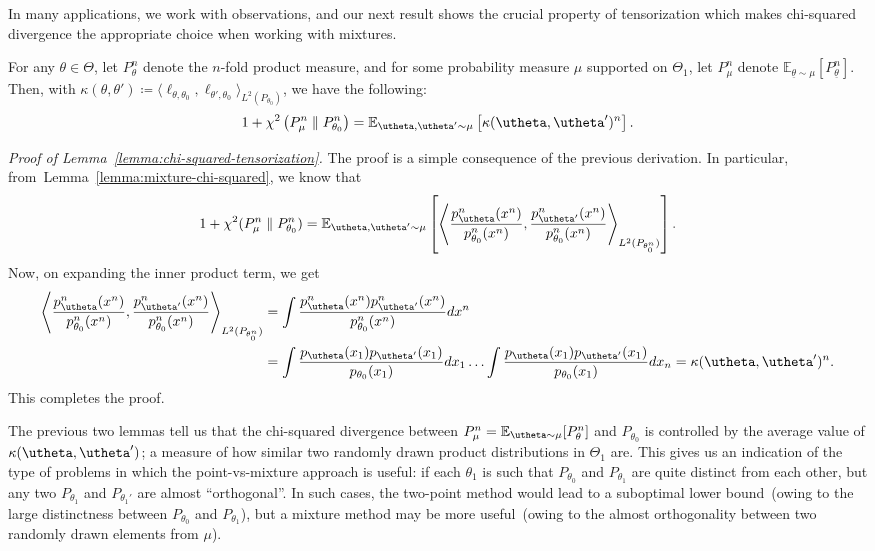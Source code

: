 \documentclass[12pt]{article}
\begin{document}
In many applications, we work with \iid observations, and our next result shows the crucial property of tensorization which makes chi-squared divergence the appropriate choice when working with mixtures. 

\begin{lemma}
\label{lemma:chi-squared-tensorization} For any $\theta \in \Theta$, let $P_{\theta}^n$ denote  the $n$-fold product measure, and for some probability measure $\mu$ supported on $\Theta_1$, let $P_\mu^n$ denote $\mathbb{E}_{\underline{\theta} \sim \mu}[P_{\underline{\theta}}^n]$. Then, with $\kappa(\theta, \theta') \coloneqq \langle \ell_{\theta, \theta_0}, \ell_{\theta', \theta_0} \rangle_{L^2(P_{\theta_0})}$, we have the following: 
\begin{align}
1 + \chi^2\lp P_{\mu}^n \parallel P_{\theta_0}^n \rp = \mathbb{E}_{\utheta, \utheta' \sim \mu}\lb \kappa(\utheta, \utheta')^n \rb. 
\end{align}
\end{lemma}
\emph{Proof of Lemma~\ref{lemma:chi-squared-tensorization}.} The proof is a simple consequence of the previous derivation. In particular, from~Lemma~\ref{lemma:mixture-chi-squared}, we know that 
\begin{align}
1 + \chi^2(P_{\mu}^n \parallel P_{\theta_0}^n) = \mathbb{E}_{\utheta, \utheta' \sim \mu}\lb \left \langle \frac{p_{\utheta}^n(x^n)}{p_{\theta_0}^n(x^n)}, \frac{p_{\utheta'}^n(x^n)}{p_{\theta_0}^n(x^n)}\right\rangle_{L^2(P_{\theta_0^n})} \rb. 
\end{align}
Now, on expanding the inner product term, we get 
\begin{align}
\left \langle \frac{p_{\utheta}^n(x^n)}{p_{\theta_0}^n(x^n)}, \frac{p_{\utheta'}^n(x^n)}{p_{\theta_0}^n(x^n)}\right\rangle_{L^2(P_{\theta_0^n})}  &= \int \frac{p_{\utheta}^n(x^n) p_{\utheta'}^n(x^n)}{p_{\theta_0}^n(x^n)} dx^n \\
&= \int \frac{p_{\utheta}(x_1) p_{\utheta'}(x_1)}{p_{\theta_0}(x_1)} dx_1 \ldots \int \frac{p_{\utheta}(x_1) p_{\utheta'}(x_1)}{p_{\theta_0}(x_1)}dx_n  = \kappa(\utheta, \utheta')^n. 
\end{align}
This completes the proof. \hfill \qedsymbol
\begin{remark}
	\label{remark:chi-squared-tensorization}
	The previous two lemmas tell us that the chi-squared divergence between $P_\mu^n = \mathbb{E}_{\utheta \sim \mu}[P_\theta^n]$ and $P_{\theta_0}$ is controlled by the average value of $\kappa(\utheta, \utheta')$; a measure of how similar two randomly drawn product distributions in $\Theta_1$ are. This gives us an indication of the type of problems in which the point-vs-mixture approach is useful: if each $\theta_1$ is such that $P_{\theta_0}$ and $P_{\theta_1}$ are quite distinct from each other, but any two $P_{\theta_1}$ and $P_{\theta_1'}$ are almost ``orthogonal''. In such cases, the two-point method would lead to a suboptimal lower bound~(owing to the large distinctness between $P_{\theta_0}$ and $P_{\theta_1}$), but a mixture method may be more useful~(owing to the almost orthogonality between two randomly drawn elements from $\mu$). 
\end{remark}
\end{document}
